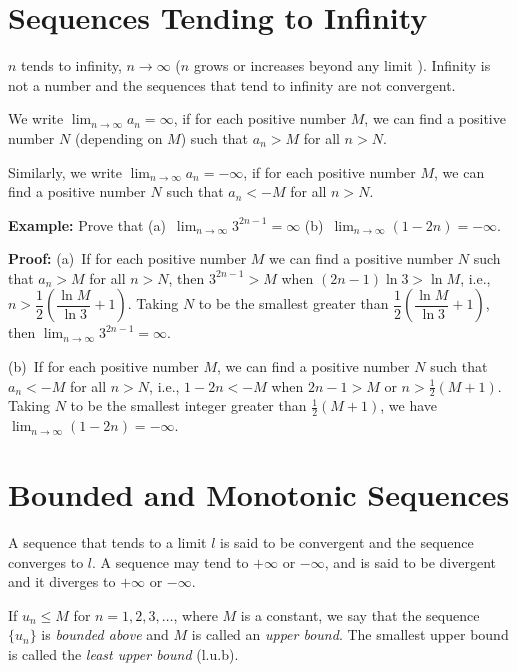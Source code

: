 \documentclass[titlepage,a4paper,12pt]{report}
\begin{document}
\section{Sequences Tending to Infinity}
$n$ tends to infinity, $n\rightarrow \infty $ ($n$ grows or increases beyond any limit ). Infinity is not a number and the sequences that tend to infinity are not convergent.

\noindent We write $\displaystyle \lim _{n\rightarrow \infty} a_n=\infty$, if for each positive number $M$, we can find a positive number $N$ (depending on $M$) such that $a_n>M$ for all $n>N$.

\noindent Similarly, we write $\displaystyle \lim _{n\rightarrow \infty} a_n=-\infty$, if for each positive number $M$, we can find a positive number $N$ such that $a_n<-M$ for all $n>N$.

\noindent \textbf{Example:} Prove that (a)\, $\displaystyle \lim _{n\rightarrow \infty} 3^{2n-1}=\infty$ \quad (b)\, $\displaystyle \lim _{n\rightarrow \infty} (1-2n)=-\infty$.

\noindent \textbf{Proof:} (a)\, If for each positive number $M$ we can find a positive number $N$ such that $a_n>M$ for all $n>N$, then $3^{2n-1}>M$ when $(2n-1)\ln 3 >\ln M$, i.e., $n>\dfrac{1}{2}\left(\dfrac{\ln M}{\ln 3}+1\right)$. Taking $N$ to be the smallest greater than $\dfrac{1}{2}\left(\dfrac{\ln M}{\ln 3}+1\right)$, then $\displaystyle \lim _{n\rightarrow \infty} 3^{2n-1}=\infty$.

\noindent (b)\, If for each positive number $M$, we can find a positive number $N$ such that $a_n<-M$ for all $n>N$, i.e., $1-2n<-M$ when $2n-1>M$ or $n>\frac{1}{2}(M+1)$. Taking $N$ to be the smallest integer greater than $\frac{1}{2}(M+1)$, we have $\displaystyle \lim _{n\rightarrow \infty} (1-2n)=-\infty$.

\section{Bounded and Monotonic Sequences}
A sequence that tends to a limit $l$ is said to be convergent and the sequence converges to $l$. A sequence may tend to $+\infty $ or $-\infty$, and is said to be divergent and it diverges to $+\infty $ or $-\infty$.

\noindent If $u_n\leq M$ for $n=1,2,3, \dots$, where $M$ is a constant, we say that the sequence $\{u_n\}$ is \textit{bounded above} and $M$ is called an \textit{upper bound}. The smallest upper bound is called the \textit{least upper bound} (l.u.b).
\end{document}
